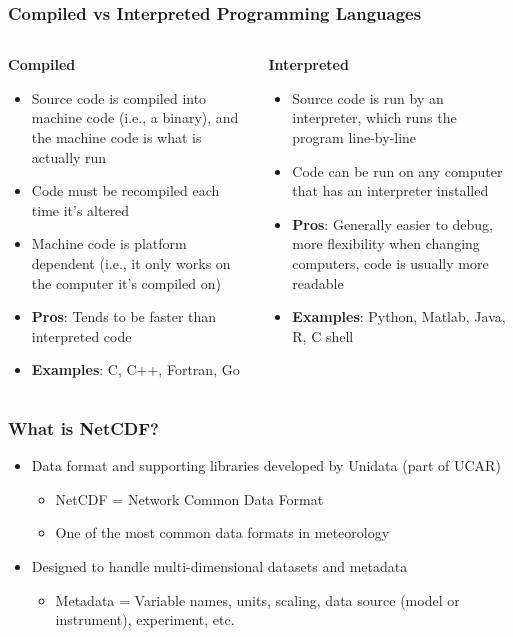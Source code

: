 \documentclass[hyperref,pdfa,unicode,utf8,usepdftitle]{beamer}
\begin{document}
\begin{frame}
  \frametitle{Compiled vs Interpreted Programming Languages}
  \begin{columns}
    \begin{column}{0.5\textwidth}
      \begin{center}
        \textbf{Compiled}
      \end{center}
      \begin{itemize}
      \item Source code is compiled into machine code (i.e., a
        binary), and the machine code is what is actually run
      \item Code must be recompiled each time it’s altered
      \item Machine code is platform dependent (i.e., it only works on
        the computer it’s compiled on)
      \item \textbf{Pros}: Tends to be faster than interpreted code
      \item \textbf{Examples}: C, C++, \alert{Fortran}, Go
      \end{itemize}
    \end{column}
    \begin{column}{0.5\textwidth}
      \begin{center}
        \textbf{Interpreted}
      \end{center}
      \begin{itemize}
      \item Source code is run by an interpreter, which runs the
        program line-by-line
      \item Code can be run on any computer that has an interpreter
        installed
      \item \textbf{Pros}: Generally easier to debug, more flexibility
        when changing computers, code is usually more readable
      \item \textbf{Examples}: Python, Matlab, Java, R, C shell
      \end{itemize}
    \end{column}
  \end{columns}
\end{frame}

\begin{frame}
  \frametitle{What is NetCDF?}
  \begin{itemize}
  \item Data format and supporting libraries developed by Unidata
    (part of UCAR)
    \begin{itemize}
    \item NetCDF = Network Common Data Format
    \item One of the most common data formats in meteorology
    \end{itemize}
  \item Designed to handle multi-dimensional datasets and metadata
    \begin{itemize}
    \item Metadata = Variable names, units, scaling, data source
      (model or instrument), experiment, etc.
    \end{itemize}
  \end{itemize}
\end{frame}
\end{document}
